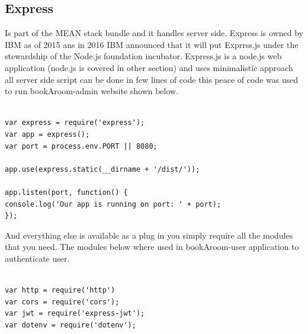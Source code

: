 \subsection{Express}
\bigbreak
Is part of the MEAN stack bundle and it handles server side. Express is owned by IBM as of 2015 ans in 2016 IBM announced that it will put Exprrss.js under the stewardship of the Node.js foundation incubator.
\bigbreak
Express.js is a node.js web application (node.js is covered in other section) and uses minimalistic approach all server side script can be done in few lines of code this peace of code was used to run bookAroom-admin website shown below.

\begin{verbatim}

var express = require('express');
var app = express();
var port = process.env.PORT || 8080;

app.use(express.static(__dirname + '/dist/'));

app.listen(port, function() {
console.log('Our app is running on port: ' + port);
});

\end{verbatim}
\bigbreak
And everything else is available as a plug in you simply require all the modules that you need. The modules below where used in bookAroom-user application to authenticate user.

\begin{verbatim}

var http = require('http')
var cors = require('cors');
var jwt = require('express-jwt');
var dotenv = require('dotenv');

\end{verbatim}


